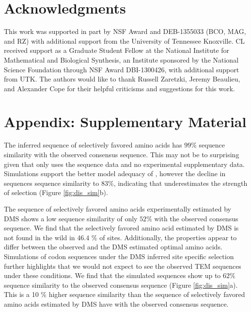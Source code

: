 \section{Acknowledgments}

This work was supported in part by NSF Award and DEB-1355033 (BCO, MAG, and RZ) with additional support from the University of Tennessee Knoxville. 
CL received support as a Graduate Student Fellow at the National Institute for Mathematical and Biological Synthesis, an Institute sponsored by the National Science Foundation through NSF Award DBI-1300426, with additional support from UTK. 
The authors would like to thank Russell Zaretzki, Jeremy Beaulieu, and Alexander Cope for their helpful criticisms and suggestions for this work.




\clearpage
\section{Appendix: Supplementary Material}

The \selac inferred sequence of selectively favored amino acids has $99 \%$ sequence similarity with the observed consensus sequence.
This may not be to surprising given that \selac only uses the sequence data and no experimental supplementary data.
Simulations support the better model adequacy of \selac, however the decline in sequences sequence similarity to $83 \%$, indicating that \selac underestimates the strength of selection (Figure \ref{fig:dis_sim}b).

The sequence of selectively favored amino acids experimentally estimated by DMS shows a low sequence similarity of only $52 \%$ with the observed consensus sequence. 
We find that the selectively favored amino acid estimated by DMS is not found in the wild in 46.4 \% of sites.
Additionally, the \PC properties appear to differ between the observed and the DMS estimated optimal amino acids.
Simulations of codon sequences under the DMS inferred site specific selection further highlights that we would not expect to see the observed TEM sequences under these conditions.
We find that the simulated sequences show up to $62 \%$ sequence similarity to the observed consensus sequence (Figure \ref{fig:dis_sim}a).
This is a 10 \% higher sequence similarity than the sequence of selectively favored amino acids estimated by DMS have with the observed consensus sequence. 


